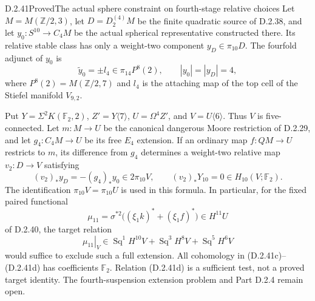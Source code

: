 \begin{claim}{D.2.41}{Proved}{The actual sphere constraint on fourth-stage relative choices}
Let $M=M(\mathbb Z/2,3)$, let $D=D_2^{(4)}M$ be the
finite quadratic source of D.2.38, and let
$y_0:S^{10}\to C_4M$ be the actual spherical representative
constructed there. Its relative stable class has only a
weight-two component $y_D\in\pi_{10}D$. The fourfold adjunct
of $y_0$ is
\[
 \widetilde y_0=\pm l_4\in\pi_{14}P^8(2),
 \qquad |y_0|=|y_D|=4,
 \tag{D.2.41a}
\]
where $P^8(2)=M(\mathbb Z/2,7)$ and $l_4$ is the
attaching map of the top cell of the Stiefel manifold $V_{9,2}$.

Put $Y=\Sigma^2K(\mathbb F_2,2)$,
$Z'=Y\langle7\rangle$, $U=\Omega^4Z'$, and
$V=U\langle6\rangle$. Thus $V$ is five-connected.
Let $m:M\to U$ be the canonical dangerous Moore restriction
of D.2.29, and let $g_4:C_4M\to U$ be its free $E_4$
extension. If an ordinary map $f:QM\to U$ restricts to $m$,
its difference from $g_4$ determines a weight-two relative map
$v_2:D\to V$ satisfying
\[
 (v_2)_*y_D=-(g_4)_*y_0\in2\pi_{10}V,
 \qquad (v_2)_*Y_{10}=0\in H_{10}(V;\mathbb F_2).
 \tag{D.2.41b}
\]
The identification $\pi_{10}V=\pi_{10}U$ is used in this formula.
In particular, for the fixed paired functional
\[
 \mu_{11}=\sigma^{*2}
 \bigl((\xi_1k)^*+(\xi_1f)^*\bigr)\in H^{11}U
 \tag{D.2.41c}
\]
of D.2.40, the target relation
\[
 \left.\mu_{11}\right|_V\in
 \operatorname{Sq}^1H^{10}V+
 \operatorname{Sq}^3H^8V+
 \operatorname{Sq}^5H^6V
 \tag{D.2.41d}
\]
would suffice to exclude such a full extension. All cohomology
in \textup{(D.2.41c)--(D.2.41d)} has coefficients $\mathbb F_2$.
Relation \textup{(D.2.41d)} is a sufficient test, not a proved
target identity. The fourth-suspension extension problem and
Part D.2.4 remain open.
\end{claim}

